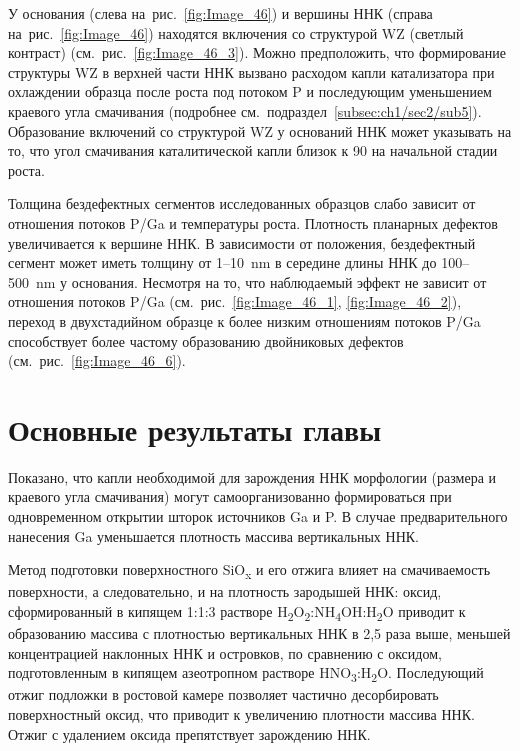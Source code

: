У основания (слева на~рис.~\cref{fig:Image_46}) и вершины ННК (справа
на~рис.~\cref{fig:Image_46}) находятся включения со структурой WZ (светлый
контраст) (см.~рис.~\cref{fig:Image_46_3}). Можно предположить, что
формирование структуры WZ в верхней части ННК вызвано расходом капли
катализатора при охлаждении образца после роста под потоком P и последующим
уменьшением краевого угла смачивания (подробнее
см.~подраздел~\cref{subsec:ch1/sec2/sub5}).  Образование включений со
структурой WZ у оснований ННК может указывать на то, что угол смачивания
каталитической капли близок к 90{\textdegree} на начальной стадии роста.

Толщина бездефектных сегментов исследованных образцов слабо зависит от
отношения потоков P/Ga и температуры роста. Плотность планарных дефектов
увеличивается к вершине ННК. В зависимости от положения, бездефектный сегмент
может иметь толщину от 1--10~\si{\nano\meter} в середине длины ННК до
100--500~\si{\nano\meter} у основания. Несмотря на то, что наблюдаемый эффект
не зависит от отношения потоков P/Ga (см.~рис.~\cref{fig:Image_46_1},
\cref{fig:Image_46_2}), переход в двухстадийном образце к более низким
отношениям потоков P/Ga способствует более частому образованию двойниковых
дефектов (см.~рис.~\cref{fig:Image_46_6}).

\section{Основные результаты главы}\label{sec:ch6/sec3}

Показано, что капли необходимой для зарождения ННК морфологии (размера и
краевого угла смачивания) могут самоорганизованно формироваться при
одновременном открытии шторок источников Ga и P. В случае предварительного
нанесения Ga уменьшается плотность массива вертикальных ННК.

Метод подготовки поверхностного SiO\textsubscript{x} и его отжига влияет на
смачиваемость поверхности, а следовательно, и на плотность зародышей ННК:
оксид, сформированный в кипящем 1:1:3 растворе
H\textsubscript{2}O\textsubscript{2}:NH\textsubscript{4}OH:H\textsubscript{2}O
приводит к образованию массива с плотностью вертикальных ННК в 2,5 раза выше,
меньшей концентрацией наклонных ННК и островков, по сравнению с оксидом,
подготовленным в кипящем азеотропном растворе
HNO\textsubscript{3}:H\textsubscript{2}O. Последующий отжиг подложки в ростовой
камере позволяет частично десорбировать поверхностный оксид, что приводит к
увеличению плотности массива ННК. Отжиг с удалением оксида препятствует
зарождению ННК.

